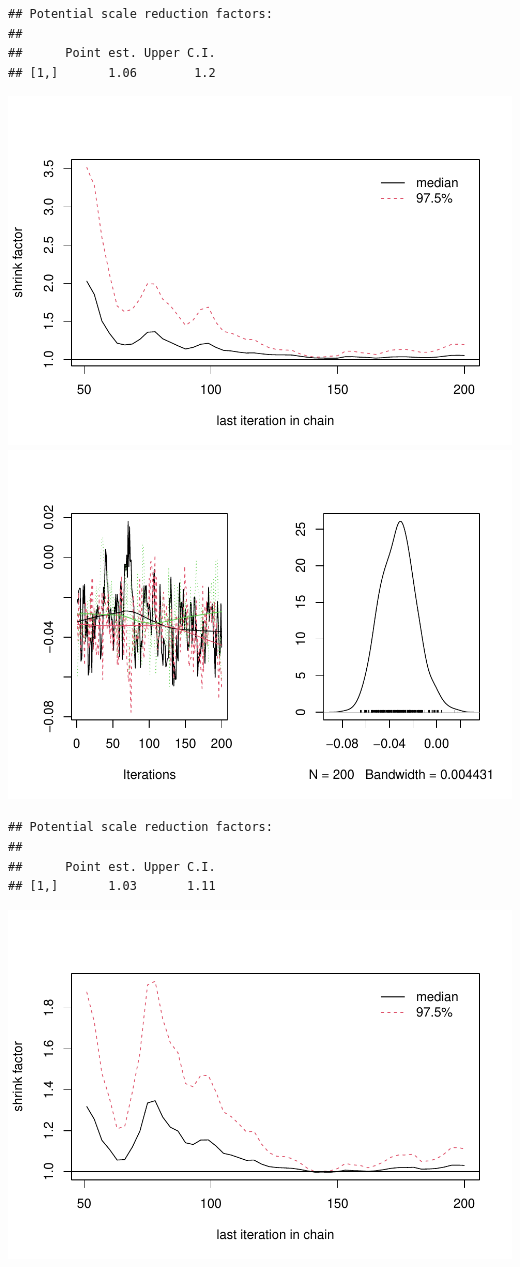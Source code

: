 \documentclass[
]{article}
\begin{document}
\begin{verbatim}
## Potential scale reduction factors:
## 
##      Point est. Upper C.I.
## [1,]       1.06        1.2
\end{verbatim}

\includegraphics{Single_effect_files/figure-latex/function_HMC-2.pdf}
\includegraphics{Single_effect_files/figure-latex/function_HMC-3.pdf}

\begin{verbatim}
## Potential scale reduction factors:
## 
##      Point est. Upper C.I.
## [1,]       1.03       1.11
\end{verbatim}

\includegraphics{Single_effect_files/figure-latex/function_HMC-4.pdf}
\end{document}
